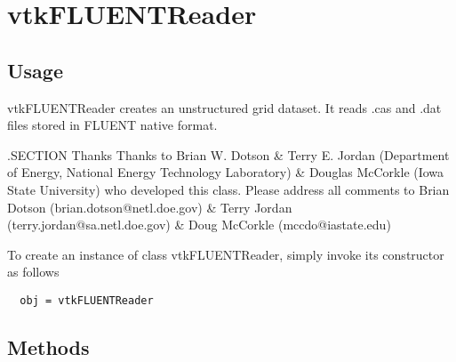 \section{vtkFLUENTReader}

\subsection{Usage}

 vtkFLUENTReader creates an unstructured grid dataset. It reads .cas and
 .dat files stored in FLUENT native format.

 .SECTION Thanks
 Thanks to Brian W. Dotson \& Terry E. Jordan (Department of Energy, National
 Energy Technology Laboratory) \& Douglas McCorkle (Iowa State University)
 who developed this class.
 Please address all comments to Brian Dotson (brian.dotson@netl.doe.gov) \&
 Terry Jordan (terry.jordan@sa.netl.doe.gov)
 \& Doug McCorkle (mccdo@iastate.edu)


To create an instance of class vtkFLUENTReader, simply
invoke its constructor as follows
\begin{verbatim}
  obj = vtkFLUENTReader
\end{verbatim}
\subsection{Methods}

